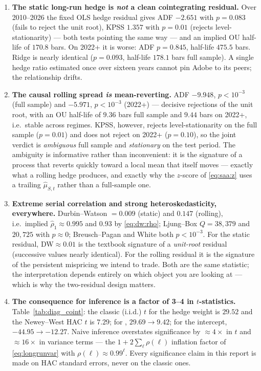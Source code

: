 \begin{enumerate}[label=\textbf{D\arabic*.}]
  \item \textbf{The static long-run hedge is \emph{not} a clean cointegrating residual.}
    Over 2010--2026 the fixed OLS hedge residual gives ADF $-2.651$ with $p=0.083$ (fails
    to reject the unit root), KPSS $1.357$ with $p=0.01$ (rejects level-stationarity) ---
    both tests pointing the same way --- and an implied OU half-life of $170.8$ bars. On
    2022+ it is worse: ADF $p=0.845$, half-life $475.5$ bars. Ridge is nearly identical
    ($p=0.093$, half-life $178.1$ bars full sample). A single hedge ratio estimated once
    over sixteen years cannot pin Adobe to its peers; the relationship drifts.
  \item \textbf{The causal rolling spread \emph{is} mean-reverting.} ADF $-9.948$,
    $p<10^{-3}$ (full sample) and $-5.971$, $p<10^{-3}$ (2022+) --- decisive rejections of
    the unit root, with an OU half-life of $9.36$ bars full sample and $9.44$ bars on
    2022+, i.e.\ stable across regimes. KPSS, however, rejects level-stationarity on the
    full sample ($p=0.01$) and does not reject on 2022+ ($p=0.10$), so the joint verdict
    is \emph{ambiguous} full sample and \emph{stationary} on the test period. The
    ambiguity is informative rather than inconvenient: it is the signature of a process
    that reverts quickly toward a local mean that itself moves --- exactly what a rolling
    hedge produces, and exactly why the $z$-score of \eqref{eq:saa:z} uses a trailing
    $\hat\mu_{S,t}$ rather than a full-sample one.
  \item \textbf{Extreme serial correlation and strong heteroskedasticity, everywhere.}
    Durbin--Watson $=0.009$ (static) and $0.147$ (rolling), i.e.\ implied
    $\hat\rho_1\approx0.995$ and $0.93$ by \eqref{eq:dw:rho}; Ljung--Box $Q=38{,}379$ and
    $20{,}725$ with $p\approx0$; Breusch--Pagan and White both $p<10^{-3}$. For the
    static residual, DW$\approx0.01$ is the textbook signature of a \emph{unit-root}
    residual (successive values nearly identical). For the rolling residual it is the
    signature of the persistent mispricing we intend to trade. Both are the same
    statistic; the interpretation depends entirely on which object you are looking at ---
    which is why the two-residual design matters.
  \item \textbf{The consequence for inference is a factor of 3--4 in $t$-statistics.}
    Table~\ref{tab:diag_coint}: the classic (i.i.d.) $t$ for the  hedge weight
    is $29.52$ and the Newey--West HAC $t$ is $7.29$; for , $29.69\to9.42$; for
    the intercept, $-44.95\to-12.27$. Naive inference overstates significance by
    $\approx4\times$ in $t$ and $\approx16\times$ in variance terms --- the
    $1+2\sum_\ell\rho(\ell)$ inflation factor of \eqref{eq:longrunvar} with
    $\rho(\ell)\approx0.99^\ell$. Every significance claim in this report is made on HAC
    standard errors, never on the classic ones.
\end{enumerate}

